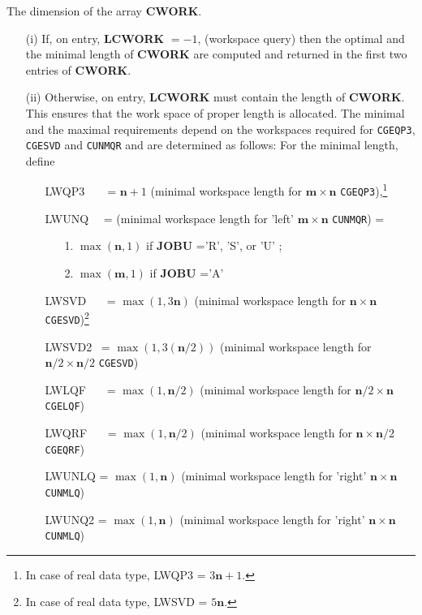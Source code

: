 \documentclass[12pt, a4paper, final]{article}
\numberwithin{equation}{section}
\begin{document}
\begin{itemize}
	The dimension of the array \textbf{CWORK}. 
	\begin{itemize}
		\item[(i)] If, on entry, \textbf{LCWORK} $=-1$, (workspace query) then the optimal and the minimal length of \textbf{CWORK} are computed and returned in the first two entries of \textbf{CWORK}. 
		
		\item[(ii)] Otherwise, on entry, \textbf{LCWORK} must contain the length of \textbf{CWORK}. This ensures that the work space of proper length is allocated. The minimal and the maximal requirements depend on the workspaces required for \texttt{CGEQP3}, \texttt{CGESVD} and \texttt{CUNMQR} and are determined as follows:
		For the minimal length, define 
		\begin{itemize}
			\item[] LWQP3\ \ \ \ = $\mathbf{n}+1$ (minimal workspace length for $\mathbf{m}\times \mathbf{n}$ \texttt{CGEQP3}),\footnote{In case of real data type, LWQP3 = $3\mathbf{n}+1$.}  
			\item[] LWUNQ \ \ = (minimal workspace length for 'left' $\mathbf{m}\times\mathbf{n}$ \texttt{CUNMQR}) = 
			\begin{itemize}\item[] 1. $\max(\mathbf{n},1)$ if \textbf{JOBU} ='R', 'S', or 'U' ; \item[] 2. $\max(\mathbf{m},1)$ if \textbf{JOBU} ='A' \end{itemize}
			\item[]  LWSVD \ \ \ = $\max(1,3 \mathbf{n})$ (minimal workspace length for $\mathbf{n}\times \mathbf{n}$ \texttt{CGESVD})\footnote{In case of real data type, LWSVD = $5\mathbf{n}$.}
			\item[]  LWSVD2 \ = $\max(1,3 (\mathbf{n}/2))$ (minimal workspace length for $\mathbf{n}/2\times \mathbf{n}/2$ \texttt{CGESVD})
			\item[] LWLQF \ \ \ = $\max(1,\mathbf{n}/2)$ (minimal workspace length for $\mathbf{n}/2 \times \mathbf{n}$ \texttt{CGELQF})
			\item[] LWQRF \ \ \ = $\max(1,\mathbf{n}/2)$ (minimal workspace length for $\mathbf{n} \times \mathbf{n}/2$ \texttt{CGEQRF})
			\item[] LWUNLQ  = $\max(1,\mathbf{n})$ (minimal workspace length for 'right' $\mathbf{n} \times \mathbf{n}$ \texttt{CUNMLQ})
			\item[] LWUNQ2  = $\max(1,\mathbf{n})$ (minimal workspace length for 'right' $\mathbf{n} \times \mathbf{n}$ \texttt{CUNMLQ})

\end{itemize}
\end{itemize}
\end{itemize}
\end{document}
